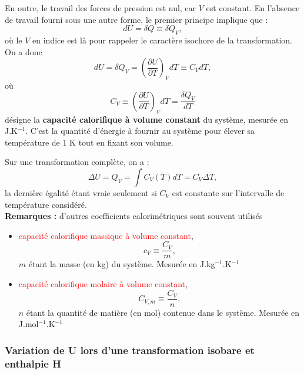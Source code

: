 \documentclass[11pt,a4paper]{report}
\begin{document}
En outre, le travail des forces de pression est nul, car $V$ est constant. En l'absence de travail fourni sous une autre forme, le premier principe implique que :
\begin{equation}
	dU = \delta Q \equiv \delta Q_V,
\end{equation}
où le $V$ en indice est là pour rappeler le caractère isochore de la transformation.\\

On a donc
\begin{equation}
	dU = \delta Q_V = \left(\frac{\partial U}{\partial T}\right)_V dT \equiv C_V dT,
\end{equation}
où
\begin{equation}
	C_V \equiv  \left(\frac{\partial U}{\partial T}\right)_V dT  = \frac{\delta Q_V}{dT}
\end{equation}
désigne la \textbf{capacité calorifique à volume constant} du système, mesurée en J.K$^{-1}$. 
C'est la quantité d'énergie à fournir au système pour élever sa température de 1 K tout en fixant son volume.

Sur une transformation complète, on a :
\begin{equation}
	\Delta U = Q_V = \int C_V(T) dT = C_V \Delta T,
\end{equation}
la dernière égalité étant vraie seulement si $C_V$ est constante sur l'intervalle de température considéré.\\

\textbf{Remarques :} d'autres coefficients calorimétriques sont souvent utilisés
\begin{itemize}
	\item \textcolor{red}{capacité calorifique massique à volume constant},
	\begin{equation}
		c_V \equiv \frac{C_V}{m},
	\end{equation}
	$m$ étant la masse (en kg) du système. Mesurée en J.kg$^{-1}$.K$^{-1}$
	\item \textcolor{red}{capacité calorifique molaire à volume constant},
	\begin{equation}
		C_{V,m} \equiv \frac{C_V}{n},
	\end{equation}
	$n$ étant la quantité de matière (en mol) contenue dans le système. Mesurée en J.mol$^{-1}$.K$^{-1}$
\end{itemize}

\subsubsection{Variation de U lors d'une transformation isobare et enthalpie H}
\end{document}
